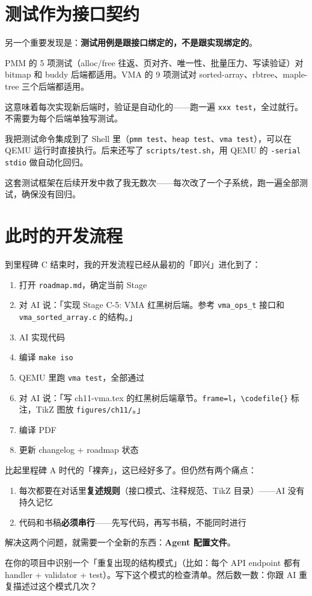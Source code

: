 \section{测试作为接口契约}

另一个重要发现是：\textbf{测试用例是跟接口绑定的，不是跟实现绑定的}。

PMM 的 5 项测试（alloc/free 往返、页对齐、唯一性、批量压力、写读验证）对 bitmap 和 buddy 后端都适用。VMA 的 9 项测试对 sorted-array、rbtree、maple-tree 三个后端都适用。

这意味着每次实现新后端时，验证是自动化的——跑一遍 \texttt{xxx test}，全过就行。不需要为每个后端单独写测试。

我把测试命令集成到了 Shell 里（\texttt{pmm test}、\texttt{heap test}、\texttt{vma test}），可以在 QEMU 运行时直接执行。后来还写了 \texttt{scripts/test.sh}，用 QEMU 的 \texttt{-serial stdio} 做自动化回归。

这套测试框架在后续开发中救了我无数次——每次改了一个子系统，跑一遍全部测试，确保没有回归。

\section{此时的开发流程}

到里程碑 C 结束时，我的开发流程已经从最初的「即兴」进化到了：

\begin{enumerate}
  \item 打开 \texttt{roadmap.md}，确定当前 Stage
  \item 对 AI 说：「实现 Stage C-5: VMA 红黑树后端。参考 \texttt{vma\_ops\_t} 接口和 \texttt{vma\_sorted\_array.c} 的结构。」
  \item AI 实现代码
  \item 编译 \texttt{make iso}
  \item QEMU 里跑 \texttt{vma test}，全部通过
  \item 对 AI 说：「写 ch11-vma.tex 的红黑树后端章节。\texttt{frame=l}，\texttt{\textbackslash codefile\{\}} 标注，TikZ 图放 \texttt{figures/ch11/}。」
  \item 编译 PDF
  \item 更新 changelog + roadmap 状态
\end{enumerate}

比起里程碑 A 时代的「裸奔」，这已经好多了。但仍然有两个痛点：

\begin{enumerate}
  \item 每次都要在对话里\textbf{复述规则}（接口模式、注释规范、TikZ 目录）——AI 没有持久记忆
  \item 代码和书稿\textbf{必须串行}——先写代码，再写书稿，不能同时进行
\end{enumerate}

解决这两个问题，就需要一个全新的东西：\textbf{Agent 配置文件}。

\begin{exercise}
在你的项目中识别一个「重复出现的结构模式」（比如：每个 API endpoint 都有 handler + validator + test）。写下这个模式的检查清单。然后数一数：你跟 AI 重复描述过这个模式几次？
\end{exercise}
